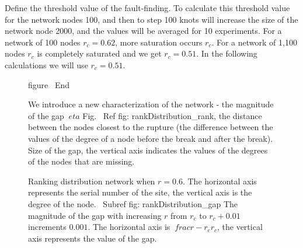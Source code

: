 \documentclass[10pt,aps,pra]{revtex4-1}
\begin{document}
Define the threshold value of the fault-finding. To calculate this threshold value for the network nodes 100, and then to step 100 knots will increase the size of the network node 2000, and the values ​​will be averaged for 10 experiments. For a network of 100 nodes $ r_c = 0.62 $, more saturation occurs $ r_c $. For a network of 1,100 nodes $ r_c $ is completely saturated and we get $ r_c = 0.51 $. In the following calculations we will use $r_c=0.51$.


\begin{figure}[H]  

\centering
{}  

\caption{
\label{fig:rankDistribution}
 Ranking distribution network when $ r = 0.6 $. The horizontal axis represents the serial number of the site, the vertical axis is the degree of the node.
\ Subref {fig: rankDistribution_gap} The magnitude of the gap with increasing $ r $ from $ r_c $ to $ r_c + 0.01 $ increments $ 0.001 $. The horizontal axis is $ \ frac {r-r_c} {r_c} $, the vertical axis represents the value of the
gap.}{figure}
\ End


We introduce a new characterization of the network - the magnitude of the gap $ \ eta $ Fig. \ Ref {fig: rankDistribution_rank}, the distance between the nodes closest to the rupture (the difference between the values ​​of the degree of a node before the break and after the break). Size of the gap, the vertical axis indicates the values ​​of the degrees of the nodes that are missing.


\end{figure}
\end{document}
